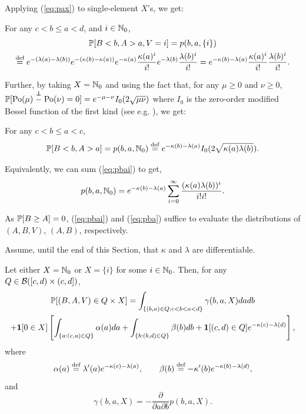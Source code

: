 \documentclass{aptpub}
\begin{document}
Applying (\ref{eq:pax}) to single-element $X$'s, we get:
\begin{corollary} For any $c < b \leq a < d$, and $i \in \N_0$,
\begin{multline}
\P[B<b,A>a,V = i] = p(b,a,\{i\}) \\ \defined e^{-(\lambda(a)-\lambda(b))}e^{-(\kappa(b)-\kappa(a))} e^{-\kappa(a)} \frac{\kappa(a)^i}{i!}e^{-\lambda(b)} \frac{\lambda(b)^i}{i!}
 = e^{-\kappa(b)-\lambda(a)} \frac{\kappa(a)^i}{i!}\frac{\lambda(b)^i}{i!}.
\label{eq:pbai}
\end{multline}
\end{corollary}
Further, by taking $X = \N_0$ and using the fact that, for any $\mu\geq 0$ and $\nu \geq 0$, $\P[\Po(\mu)\stackrel{\indep{}}{-}\Po(\nu)=0]=e^{-\mu-\nu}I_{0}(2\sqrt{\mu\nu})$ where $I_0$ is the zero-order modified Bessel function of the first kind (see e.g. \cite{skellam1946frequency}), we get:
\begin{corollary} For any $c < b\leq a < c$,
\begin{equation}
\P[B<b,A>a]=p(b,a,\N_0) \defined e^{-\kappa(b)-\lambda(a)} I_{0}(2\sqrt{\kappa(a)\lambda(b)}).
\label{eq:pba}
\end{equation}
\end{corollary}
\begin{remark}
Equivalently, we can sum (\ref{eq:pbai}) to get,
$$
p(b,a,\N_0)=e^{-\kappa(b)-\lambda(a)}\sum_{i=0}^\infty\frac{(\kappa(a)\lambda(b))^i}{i!i!}.
$$
\end{remark}
As $\P[B\geq A]=0$, (\ref{eq:pbai}) and (\ref{eq:pba}) suffice to evaluate the distributions of $(A,B,V)$, $(A,B)$, respectively.

Assume, until the end of this Section, that $\kappa$ and $\lambda$ are differentiable.

\begin{proposition}
\label{th:abv}
Let either $X = \N_0$ or $X = \{i\}$ for some $i\in \N_0$. Then, for any $Q\in\B([c,d)\times(c,d])$,
\begin{multline}
\P[(B,A,V)\in Q \times X]=\int_{\{(b,a)\in Q: c<b<a<d\}}\gamma(b,a,X)dadb\\
+\charf [0\in X] \left[\int_{\{a:(c,a) \in Q \}}\alpha(a)da
+\int_{\{b:(b,d) \in Q \}}\beta(b)db+\charf[(c,d)\in Q]e^{-\kappa(c)-\lambda(d)}
\right],
\label{eq:pbc}
\end{multline}
where 
$$
\alpha(a)\defined 
\lambda'(a)e^{-\kappa(c)-\lambda(a)},\qquad
\beta(b)\defined-\kappa'(b)e^{-\kappa(b)}{}^{-\lambda(d)},
$$
and
$$
\gamma(b,a,X) = -\frac{\partial}{\partial a\partial b}p(b,a,X).
$$
\end{proposition}
\end{document}
